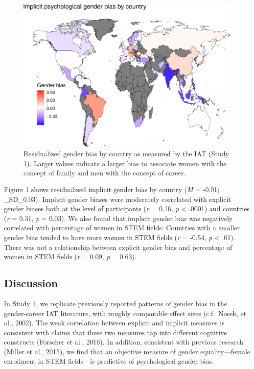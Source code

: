 \documentclass[man]{apa6}
\theoremstyle{definition}
\theoremstyle{definition}
\theoremstyle{definition}
\theoremstyle{remark}
\begin{document}
\begin{figure}[t]

{\centering \includegraphics{iat_lang_files/figure-latex/mapplot-1} 

}

\caption{Residualized gender bias by country as measured by the IAT (Study 1). Larger values indicate a larger bias to associate women with the concept of family and men with the concept of career.}\label{fig:mapplot}
\end{figure}

Figure 1 shows residualized implicit gender bias by country (\emph{M} =
-0.01; \_SD\_0.03). Implicit gender biases were moderately correlated
with explicit gender biases both at the level of participants (\emph{r}
= 0.16, \emph{p} \textless{} .0001) and countries (\emph{r} = 0.31,
\emph{p} = 0.03). We also found that implicit gender bias was negatively
correlated with percentage of women in STEM fields: Countries with a
smaller gender bias tended to have more women in STEM fields (\emph{r} =
-0.54, \emph{p} \textless{} .01). There was not a relationship between
explicit gender bias and percentage of women in STEM fields (\emph{r} =
0.09, \emph{p} = 0.63).

\subsection{Discussion}\label{discussion}

In Study 1, we replicate previously reported patterns of gender bias in
the gender-career IAT literature, with roughly comparable effect sizes
(c.f.~Nosek, et al., 2002). The weak correlation between explicit and
implicit measures is consistent with claims that these two measures tap
into different cognitive constructs (Forscher et al., 2016). In
addition, consistent with previous research (Miller et al., 2015), we
find that an objective measure of gender equality---female enrollment in
STEM fields---is predictive of psychological gender bias.
\end{document}
